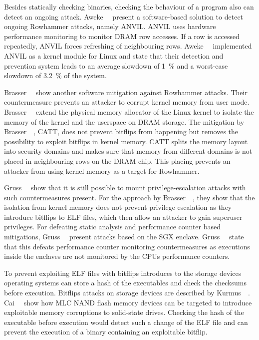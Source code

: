 Besides statically checking binaries, checking the behaviour of a program also
can detect an ongoing attack. Aweke~\etal~\cite{anvil} present a software-based
solution to detect ongoing Rowhammer attacks, namely ANVIL. ANVIL uses hardware
performance monitoring to monitor DRAM row accesses. If a row is accessed
repeatedly, ANVIL forces refreshing of neighbouring rows.
Aweke~\etal~\cite{anvil} implemented ANVIL as a kernel module for Linux and
state that their detection and prevention system leads to an average slowdown of
\SI{1}{\percent} and a worst-case slowdown of \SI{3.2}{\percent} of the system.

Brasser~\etal~\cite{canttouch} show another software mitigation against
Rowhammer attacks. Their countermeasure prevents an attacker to corrupt kernel
memory from user mode. Brasser~\etal~\cite{canttouch} extend the physical memory
allocator of the Linux kernel to isolate the memory of the kernel and the
userspace on DRAM storage. The mitigation by Brasser~\etal~\cite{canttouch},
CATT, does not prevent bitflips from happening but removes the possibility to
exploit bitflips in kernel memory. CATT splits the memory layout into security
domains and makes sure that memory from different domains is not placed in
neighbouring rows on the DRAM chip. This placing prevents an attacker from using
kernel memory as a target for Rowhammer.

Gruss~\etal~\cite{flipinthewall} show that it is still possible to mount
privilege-escalation attacks with such countermeasures present. For the approach
by Brasser~\etal~\cite{canttouch}, they show that the isolation from kernel
memory does not prevent privilege escalation as they introduce bitflips to ELF
files, which then allow an attacker to gain superuser privileges. For defeating
static analysis and performance counter based mitigations,
Gruss~\etal~\cite{flipinthewall} present attacks based on the SGX enclave.
Gruss~\etal~\cite{flipinthewall} state that this defeats performance counter
monitoring countermeasures as executions inside the enclaves are not monitored
by the CPU\textquotesingle s performance counters.

To prevent exploiting ELF files with bitflips introduces to the storage devices
operating systems can store a hash of the executables and check the checksums
before execution. Bitflips attacks on storage devices are described by
Kurmus~\etal~\cite{rowssdhammer}. Cai~\etal~\cite{rownandhammer} show how MLC
NAND flash memory devices can be targeted to introduce exploitable memory
corruptions to solid-state drives. Checking the hash of the executable before
execution would detect such a change of the ELF file and can prevent the
execution of a binary containing an exploitable bitflip.


